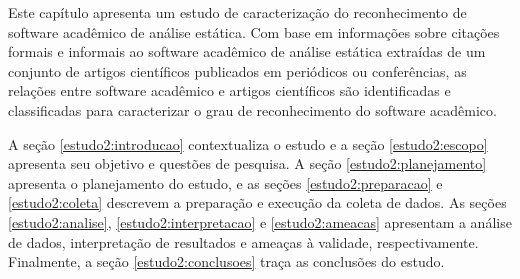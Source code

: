 {}\label{estudo2}

Este capítulo apresenta
um estudo de caracterização do reconhecimento de software acadêmico de análise estática.
Com base em informações sobre
citações formais e informais ao software acadêmico de análise estática %
extraídas de um conjunto de artigos científicos publicados em periódicos ou conferências,
as relações entre software acadêmico e artigos científicos
são identificadas e classificadas %
para caracterizar o grau de reconhecimento do software acadêmico.

A seção \ref{estudo2:introducao} contextualiza o estudo
e a seção \ref{estudo2:escopo} apresenta seu objetivo e questões de pesquisa.
A seção \ref{estudo2:planejamento} apresenta o planejamento do estudo, e
as seções \ref{estudo2:preparacao} e \ref{estudo2:coleta} descrevem a preparação e execução da coleta de dados.
As seções \ref{estudo2:analise}, \ref{estudo2:interpretacao} e \ref{estudo2:ameacas}
apresentam a análise de dados, interpretação de resultados e ameaças à validade, respectivamente.
Finalmente, a seção \ref{estudo2:conclusoes} traça as conclusões do estudo.

